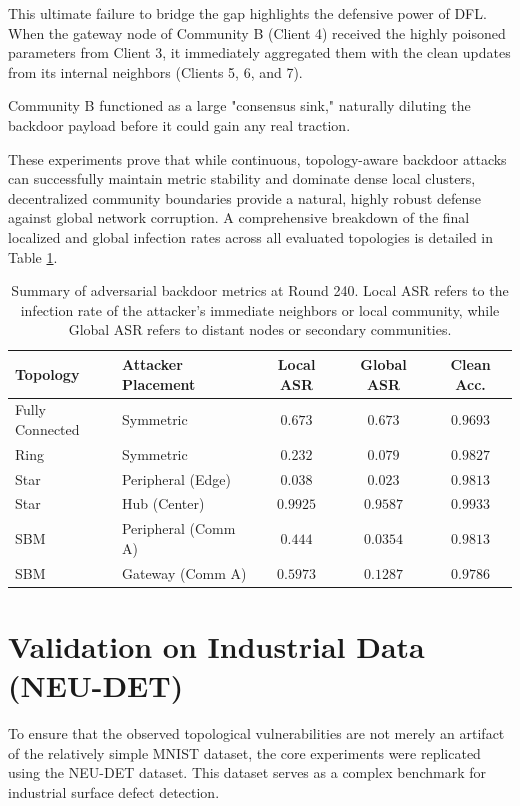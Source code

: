 This ultimate failure to bridge the gap highlights the defensive power of DFL. When the gateway node of Community B (Client 4) received the highly poisoned parameters from Client 3, it immediately aggregated them with the clean updates from its internal neighbors (Clients 5, 6, and 7). 

Community B functioned as a large "consensus sink," naturally diluting the backdoor payload before it could gain any real traction. 

These experiments prove that while continuous, topology-aware backdoor attacks can successfully maintain metric stability and dominate dense local clusters, decentralized community boundaries provide a natural, highly robust defense against global network corruption. A comprehensive breakdown of the final localized and global infection rates across all evaluated topologies is detailed in Table \ref{tab:adversarial_metrics_summary}.

\begin{table}[t]
    \centering
    \renewcommand{\arraystretch}{1.3}
    \begin{tabular}{l l c c c}
        \toprule
        \textbf{Topology} & \textbf{Attacker Placement} & \textbf{Local ASR} & \textbf{Global ASR} & \textbf{Clean Acc.} \\
        \midrule
        Fully Connected & Symmetric & $0.673$ & $0.673$ & $0.9693$ \\
        Ring & Symmetric & $0.232$ & $0.079$ & $0.9827$ \\
        Star & Peripheral (Edge) & $0.038$ & $0.023$ & $0.9813$ \\
        Star & Hub (Center) & $0.9925$ & $0.9587$ & $0.9933$ \\
        SBM & Peripheral (Comm A) & $0.444$ & $0.0354$ & $0.9813$ \\
        SBM & Gateway (Comm A) & $0.5973$ & $0.1287$ & $0.9786$ \\
        \bottomrule
    \end{tabular}
    \vspace{0.2cm}
    \caption{Summary of adversarial backdoor metrics at Round 240. Local ASR refers to the infection rate of the attacker's immediate neighbors or local community, while Global ASR refers to distant nodes or secondary communities.}
    \label{tab:adversarial_metrics_summary}
\end{table}

\section{Validation on Industrial Data (NEU-DET)}
To ensure that the observed topological vulnerabilities are not merely an artifact of the relatively simple MNIST dataset, the core experiments were replicated using the NEU-DET dataset. This dataset serves as a complex benchmark for industrial surface defect detection.

